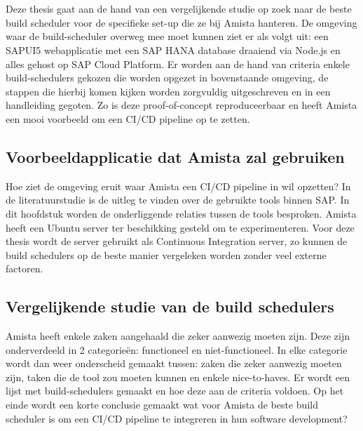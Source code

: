 
\chapter{}
\label{ch:methodologie}

Deze thesis gaat aan de hand van een vergelijkende studie op zoek naar de beste build scheduler voor de specifieke set-up die ze bij Amista hanteren. De omgeving waar de build-scheduler overweg mee moet kunnen ziet er als volgt uit: een SAPUI5 webapplicatie met een SAP HANA database draaiend via Node.js en alles gehost op SAP Cloud Platform. Er worden aan de hand van criteria enkele build-schedulers gekozen die worden opgezet in bovenstaande omgeving, de stappen die hierbij komen kijken worden zorgvuldig uitgeschreven en in een handleiding gegoten. Zo is deze proof-of-concept reproduceerbaar en heeft Amista een mooi voorbeeld om een CI/CD pipeline op te zetten.



\section{Voorbeeldapplicatie dat Amista zal gebruiken}
\label{sec:voorbeeldapplicatie}
Hoe ziet de omgeving eruit waar Amista een CI/CD pipeline in wil opzetten? In de literatuurstudie is de uitleg te vinden over de gebruikte tools binnen SAP. In dit hoofdstuk worden de onderliggende relaties tussen de tools besproken.
Amista heeft een Ubuntu server ter beschikking gesteld om te experimenteren. Voor deze thesis wordt de server gebruikt als Continuous Integration server, zo kunnen de build schedulers op de beste manier vergeleken worden zonder veel externe factoren.

\section{Vergelijkende studie van de build schedulers}
\label{sec:Vergelijkende-studie-build-schedulers}
Amista heeft enkele zaken aangehaald die zeker aanwezig moeten zijn. Deze zijn onderverdeeld in 2 categorieën: functioneel en niet-functioneel. In elke categorie wordt dan weer onderscheid gemaakt tussen: zaken die zeker aanwezig moeten zijn, taken die de tool zou moeten kunnen en enkele nice-to-haves. Er wordt een lijst met build-schedulers gemaakt en hoe deze aan de criteria voldoen. Op het einde wordt een korte conclusie gemaakt wat voor Amista de beste build scheduler is om een CI/CD pipeline te integreren in hun software development? %


